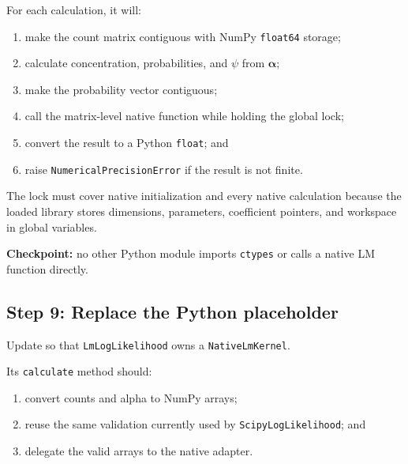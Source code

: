 \documentclass[11pt,a4paper]{article}
\begin{document}
For each calculation, it will:

\begin{enumerate}

\item make the count matrix contiguous with NumPy \texttt{float64} storage;

\item calculate concentration, probabilities, and \(\psi\) from
\(\boldsymbol{\alpha}\);

\item make the probability vector contiguous;

\item call the matrix-level native function while holding the global lock;

\item convert the result to a Python \texttt{float}; and

\item raise \texttt{NumericalPrecisionError} if the result is not finite.

\end{enumerate}

The lock must cover native initialization and every native calculation because
the loaded library stores dimensions, parameters, coefficient pointers, and
workspace in global variables.

\textbf{Checkpoint:} no other Python module imports \texttt{ctypes} or calls a
native LM function directly.

\subsection{Step 9: Replace the Python placeholder}

Update  so that
\texttt{LmLogLikelihood} owns a \texttt{NativeLmKernel}.

Its \texttt{calculate} method should:

\begin{enumerate}

\item convert counts and alpha to NumPy arrays;

\item reuse the same validation currently used by
\texttt{ScipyLogLikelihood}; and

\item delegate the valid arrays to the native adapter.

\end{enumerate}
\end{document}
